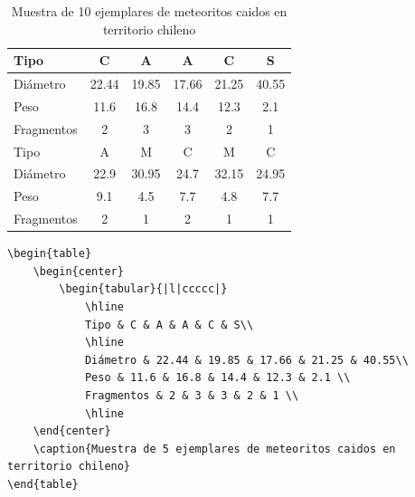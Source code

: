 \documentclass[../notes.tex]{subfiles}
\begin{document}
        \begin{table}
            \begin{center}
                \begin{tabular}{|l|ccccc|}
                    \hline
                    Tipo & C & A & A & C & S\\
                    \hline
                    Diámetro & 22.44 & 19.85 & 17.66 & 21.25 & 40.55\\
                    Peso & 11.6 & 16.8 & 14.4 & 12.3 & 2.1 \\
                    Fragmentos & 2 & 3 & 3 & 2 & 1 \\
                    \hline
                    \hline
                    Tipo & A & M & C & M & C\\
                    \hline
                    Diámetro & 22.9 & 30.95 & 24.7 & 32.15 & 24.95 \\
                    Peso & 9.1 & 4.5 & 7.7 & 4.8 & 7.7 \\
                    Fragmentos & 2 & 1 & 2 & 1 & 1 \\
                    \hline
                \end{tabular}
            \end{center}
            \caption{Muestra de 10 ejemplares de meteoritos caidos en territorio chileno}
        \end{table}
    \begin{verbatim}
\begin{table}
    \begin{center}
        \begin{tabular}{|l|ccccc|}
            \hline
            Tipo & C & A & A & C & S\\
            \hline
            Diámetro & 22.44 & 19.85 & 17.66 & 21.25 & 40.55\\
            Peso & 11.6 & 16.8 & 14.4 & 12.3 & 2.1 \\
            Fragmentos & 2 & 3 & 3 & 2 & 1 \\
            \hline
    \end{center}
    \caption{Muestra de 5 ejemplares de meteoritos caidos en territorio chileno}
\end{table}
    \end{verbatim}
\end{document}
